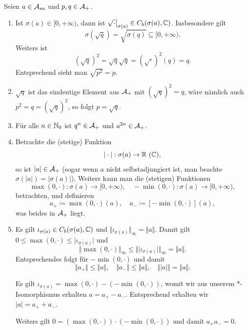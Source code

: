 \begin{remark}
    Seien $a \in \mathcal{A}_{sa}$ und $p, q \in \mathcal{A}_+$.
    \begin{enumerate}
        \item Ist $\sigma(a) \in [0, +\infty)$, dann ist $\restr{\sqrt{\cdot}}{\sigma(a)} \in C_b(\sigma(a), \C)$. Insbesondere gilt
        $$ \sigma(\sqrt{q}) = \sqrt{\sigma(q)} \subseteq [0, +\infty). $$
        Weiters ist
        $$ (\sqrt{q})^2 = \sqrt{q} \sqrt{q} = (\sqrt{\cdot})^2(q) = q. $$
        Entsprechend sieht man $\sqrt{p^2} = p$.

        \item $\sqrt{q}$ ist das eindeutige Element aus $\mathcal{A}_+$ mit $(\sqrt{q})^2 = q$, wäre nämlich auch $p^2 = q = (\sqrt{q})^2$, so folgt $p = \sqrt{q}$.
        
        \item Für alle $n \in \mathbb{N}_0$ ist $q^n \in \mathcal{A}_+$ und $a^{2n} \in \mathcal{A}_+$.
        
        \item Betrachte die (stetige) Funktion
        $$ \vert \cdot \vert : \sigma(a) \to \R \ (\C), $$
        so ist $\vert a \vert \in \mathcal{A}_+$ (sogar wenn $a$ nicht selbstadjungiert ist, man beachte $\sigma(\vert a \vert) = \vert \sigma(a) \vert$). Weiters kann man die (stetigen) Funktionen
        $$ \max(0, \cdot) : \sigma(a) \to [0, +\infty), \quad -\min(0, \cdot) : \sigma(a) \to [0,+\infty), $$
        betrachten, und definieren
        $$ a_+ \coloneqq \max(0, \cdot)(a), \quad a_- \coloneqq [-\min(0,\cdot)](a), $$
        was beides in $\mathcal{A}_+$ liegt.

        \item Es gilt $\iota_{\sigma(a)} \in C_b(\sigma(a), \mathbb{C})$ und $\Vert \iota_{\sigma(a)} \Vert_\infty = \Vert a \Vert$. Damit gilt $0 \leq \max(0, \cdot) \leq \vert \iota_{\sigma(a)} \vert$ und
        $$ \Vert \max(0, \cdot) \Vert_\infty \leq \Vert \vert \iota_{\sigma(a)} \vert \Vert_\infty = \Vert a \Vert. $$
        Entsprechendes folgt für $-\min(0, \cdot)$ und damit
        $$ \Vert a_+ \Vert \leq \Vert a \Vert, \quad \Vert a_- \Vert \leq \Vert a \Vert, \quad \Vert \vert a \vert \Vert = \Vert a \Vert. $$

        Es gilt $\iota_{\sigma(a)} = \max(0, \cdot) - (- \min(0, \cdot))$, womit wir aus unserem $\ast$-Isomorphismus erhalten $ a = a_+ - a_- $. Entsprechend erhalten wir $\vert a \vert = a_+ + a_-$.

        Weiters gilt $0 = (\max(0, \cdot)) \cdot (-\min(0, \cdot))$ und damit $ a_+ a_- = 0 $.


\end{enumerate}
\end{remark}
